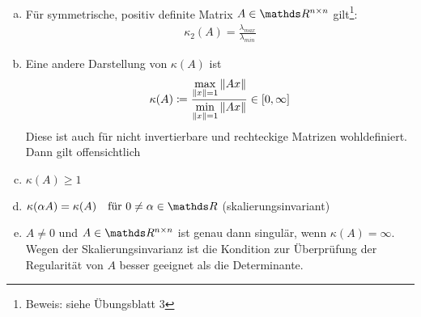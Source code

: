\begin{Beme}
  \label{3.2.13}~
  \begin{enumerate}[a)]
  \item Für symmetrische, positiv definite Matrix $A\in \Renn$ gilt\footnote{Beweis: siehe Übungsblatt 3}: 
    \begin{gather}
      \kappa_2(A) = \frac{\lambda_{max}}{\lambda_{min}} \label{III.2.13}
    \end{gather}
  \item Eine andere Darstellung von $\kappa(A)$ ist
    \begin{gather}
      \kappa(A) \coloneqq 
      \frac{\underset{\left\| x \right\|=1}{\max}\left\| Ax \right\|}{\underset{\left\| x \right\|=1}{\min}\left\| Ax \right\|} \in  \left[ 0, \infty \right]
      \label{III.2.14}
    \end{gather}
    Diese ist auch für nicht invertierbare und rechteckige Matrizen wohldefiniert.
    Dann gilt offensichtlich
  \item $\kappa(A) \geq 1$
  \item $\kappa(\alpha A)=\kappa(A) \quad \text{für } 0\neq\alpha\in\R$ (skalierungsinvariant)
  \item $A\neq 0$ und $A\in\Renn $ ist genau dann singulär, wenn $\kappa(A)=\infty$. \\
    Wegen der Skalierungsinvarianz ist die Kondition zur Überprüfung der Regularität von $A$ 
    besser geeignet als die Determinante.
  \end{enumerate}
\end{Beme}


